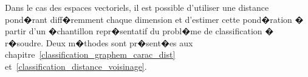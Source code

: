 Dans le cas des espaces vectoriels, il est possible d'utiliser une distance pond�rant diff�remment chaque dimension et d'estimer cette pond�ration � partir d'un �chantillon repr�sentatif du probl�me de classification � r�soudre. Deux m�thodes sont pr�sent�es aux chapitre~\ref{classification_graphem_carac_dist} et~\ref{classification_distance_voisinage}.

















\newpage



%
%
